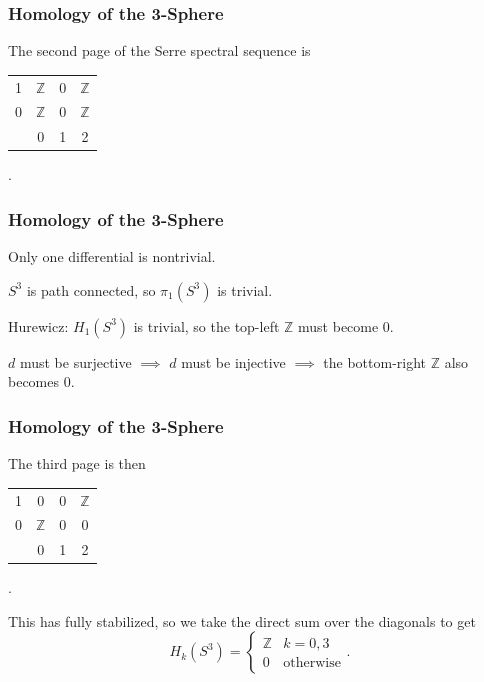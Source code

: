 \documentclass{beamer}
\begin{document}
\begin{frame}
	\frametitle{Homology of the 3-Sphere}

	The second page of the Serre spectral sequence is
	\begin{center}
                \begin{tabular}{ c | c c c }
                        1 & $\mathbb{Z}$ & $0$ &$\mathbb{Z}$\\
                        0 & $\mathbb{Z}$ & $0$ &$\mathbb{Z}$\\
                        \hline
                          & 0 & 1 & 2
                \end{tabular}.
        \end{center}
\end{frame}

\begin{frame}[fragile]
	\frametitle{Homology of the 3-Sphere}

	Only one differential is nontrivial.
	\begin{center}
        \end{center}
	$S^{3}$ is path connected, so $\pi_{1}(S^{3})$ is trivial.

	\vspace{5mm}
	Hurewicz: $H_1(S^{3})$ is trivial, so the top-left $\mathbb{Z}$ must become 0.

	\vspace{5mm}
	$d$ must be surjective $\implies $ $d$ must be injective $\implies $ the bottom-right $\mathbb{Z}$ also becomes 0.
\end{frame}

\begin{frame}
	\frametitle{Homology of the 3-Sphere}

	The third page is then
	\begin{center}
                \begin{tabular}{ c | c c c }
                        1 & $0$ & $0$ &$\mathbb{Z}$\\
                        0 & $\mathbb{Z}$ & $0$ &$0$\\
                        \hline
                          & 0 & 1 & 2
                \end{tabular}.
        \end{center}
	This has fully stabilized, so we take the direct sum over the diagonals to get
	\[
		H_{k}(S^{3}) =
                \begin{cases}
                        \mathbb{Z}&k=0,3\\
                        0&\text{otherwise}
                \end{cases}.
	\] 
\end{frame}
\end{document}
